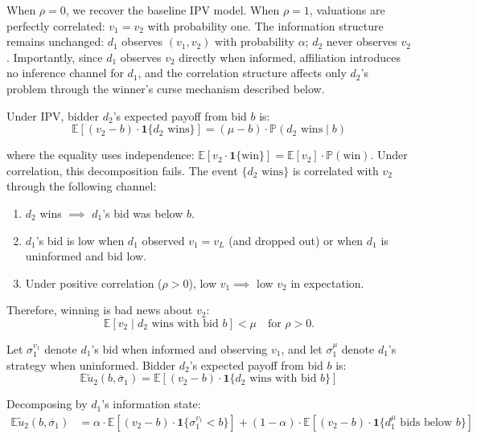 \noindent When $\rho = 0$, we recover the baseline IPV model. When $\rho = 1$, valuations are perfectly correlated: $v_1 = v_2$ with probability one. The information structure remains unchanged: $d_1$ observes $(v_1, v_2)$ with probability $\alpha$; $d_2$ never observes $v_2$. Importantly, since $d_1$ observes $v_2$ directly when informed, affiliation introduces no inference channel for $d_1$, and the correlation structure affects only $d_2$'s problem through the winner's curse mechanism described below.

\noindent Under IPV, bidder $d_2$'s expected payoff from bid $b$ is:
\begin{equation*}
    \mathbb{E}[(v_2 - b) \cdot \mathbf{1}\{d_2 \text{ wins}\}] = (\mu - b) \cdot \mathbb{P}(d_2 \text{ wins} \mid b)
\end{equation*}

\noindent where the equality uses independence: $\mathbb{E}[v_2 \cdot \mathbf{1}\{\text{win}\}] = \mathbb{E}[v_2] \cdot \mathbb{P}(\text{win})$. Under correlation, this decomposition fails. The event $\{d_2 \text{ wins}\}$ is correlated with $v_2$ through the following channel:
\begin{enumerate}
    \item $d_2$ wins $\implies$ $d_1$'s bid was below $b$.
    \item $d_1$'s bid is low when $d_1$ observed $v_1 = v_L$ (and dropped out) or when $d_1$ is uninformed and bid low.
    \item Under positive correlation ($\rho > 0$), low $v_1 \implies$ low $v_2$ in expectation.
\end{enumerate}

\noindent Therefore, winning is bad news about $v_2$:
\begin{equation*}
    \mathbb{E}[v_2 \mid d_2 \text{ wins with bid } b] < \mu \quad \text{for } \rho > 0.
\end{equation*}

\noindent Let $\sigma_1^{v_1}$ denote $d_1$'s bid when informed and observing $v_1$, and let $\sigma_1^\mu$ denote $d_1$'s strategy when uninformed. Bidder $d_2$'s expected payoff from bid $b$ is:
\begin{equation*}
    \mathbb{E}\tilde{u}_2(b,\overline{\sigma}_1) = \mathbb{E}\left[ (v_2 - b) \cdot \mathbf{1}\{d_2 \text{ wins with bid } b\} \right]
\end{equation*}

\noindent Decomposing by $d_1$'s information state:
\begin{align*}
    \mathbb{E}\tilde{u}_2(b,\overline{\sigma}_1) &= \alpha \cdot \mathbb{E}\left[ (v_2 - b) \cdot \mathbf{1}\{\sigma_1^{v_1} < b\} \right] + (1 - \alpha) \cdot \mathbb{E}\left[ (v_2 - b) \cdot \mathbf{1}\{d_1^\mu \text{ bids below } b\} \right]
\end{align*}

